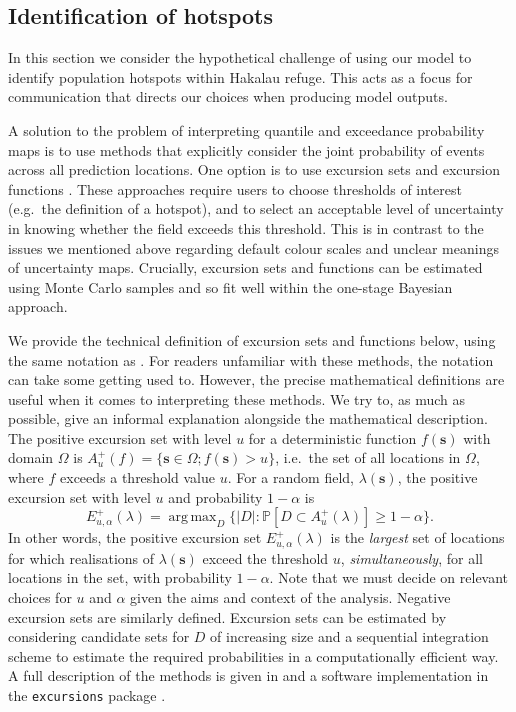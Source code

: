 \documentclass{statsoc}
\newcommand{\bs}{\mathbf{s}}
\DeclareMathOperator*{\argmax}{arg\,max}  %
\begin{document}
\subsection{Identification of hotspots}

In this section we consider the hypothetical challenge of using our model to identify population hotspots within Hakalau refuge.  This acts as a focus for communication that directs our choices when producing model outputs.

A solution to the problem of interpreting quantile and exceedance probability maps is to use methods that explicitly consider the joint probability of events across all prediction locations. One option is to use excursion sets and excursion functions \citep{bolin_excursion_2015}.  These approaches require users to choose thresholds of interest (e.g.\ the definition of a hotspot), and to select an acceptable level of uncertainty in knowing whether the field exceeds this threshold.  This is in contrast to the issues we mentioned above regarding default colour scales and unclear meanings of uncertainty maps.  Crucially, excursion sets and functions can be estimated using Monte Carlo samples and so fit well within the one-stage Bayesian approach.

We provide the technical definition of excursion sets and functions below, using the same notation as \cite{bolin_excursion_2015}.  For readers unfamiliar with these methods, the notation can take some getting used to.  However, the precise mathematical definitions are useful when it comes to interpreting these methods.  We try to, as much as possible, give an informal explanation alongside the mathematical description.  The positive excursion set with level $u$ for a deterministic function $f(\bs)$ with domain $\Omega$ is $A_u^{+}(f) = \{ \bs \in \Omega ; f(\bs) > u \}$, i.e.\ the set of all locations in $\Omega$, where $f$ exceeds a threshold value $u$. For a random field, $\lambda(\bs)$, the positive excursion set with level $u$ and probability $1 - \alpha$ is
\begin{equation*}
E_{u,\alpha}^{+}(\lambda) = \argmax_{D}\{\lvert D \rvert : \mathbb{P}\left[D \subset A_u^{+}(\lambda)\right] \geq 1 - \alpha \} .
\end{equation*}
In other words, the positive excursion set $E_{u,\alpha}^{+}(\lambda)$ is the \textit{largest} set of locations for which realisations of $\lambda(\bs)$ exceed the threshold $u$, \textit{simultaneously}, for all locations in the set, with probability $1-\alpha$.  Note that we must decide on relevant choices for $u$ and $\alpha$ given the aims and context of the analysis.  Negative excursion sets are similarly defined.  Excursion sets can be estimated by considering candidate sets for $D$ of increasing size and a sequential integration scheme to estimate the required probabilities in a computationally efficient way.  A full description of the methods is given in \cite{bolin_excursion_2015} and a software implementation in the \texttt{excursions} package \citep{bolin_calculating_2018}.
\end{document}
